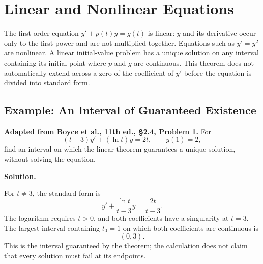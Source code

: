 \documentclass[11pt]{article}
\newenvironment{solution}
    {\par\noindent\textbf{Solution.}\par}
    {\par}
\begin{document}
\section{Linear and Nonlinear Equations}
The first-order equation \(y'+p(t)y=g(t)\) is linear: \(y\) and its
derivative occur only to the first power and are not multiplied
together. Equations such as \(y'=y^2\) are nonlinear. A linear
initial-value problem has a unique solution on any interval containing
its initial point where \(p\) and \(g\) are continuous. This theorem
does not automatically extend across a zero of the coefficient of
\(y'\) before the equation is divided into standard form.

\subsection{Example: An Interval of Guaranteed Existence}
\textbf{Adapted from Boyce et al., 11th ed., \S2.4, Problem 1.}
For
\[
(t-3)y'+(\ln t)y=2t,\qquad y(1)=2,
\]
find an interval on which the linear theorem guarantees a unique
solution, without solving the equation.
\begin{solution}
For \(t\ne3\), the standard form is
\[
y'+\frac{\ln t}{t-3}y=\frac{2t}{t-3}.
\]
The logarithm requires \(t>0\), and both coefficients have a
singularity at \(t=3\). The largest interval containing \(t_0=1\)
on which both coefficients are continuous is
\[
\boxed{(0,3).}
\]
This is the interval guaranteed by the theorem; the calculation does
not claim that every solution must fail at its endpoints.
\end{solution}
\end{document}
